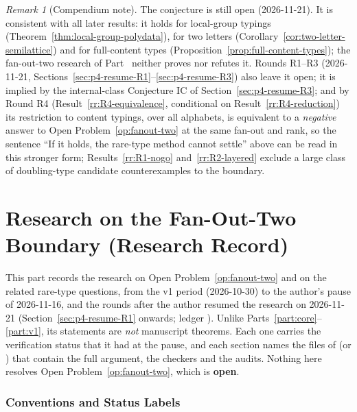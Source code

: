 \documentclass[11pt]{article}
\numberwithin{equation}{section}
\theoremstyle{plain}
\theoremstyle{definition}
\theoremstyle{remark}
\newtheorem{remark}[theorem]{Remark}
\theoremstyle{plain}
\begin{document}
\begin{remark}[Compendium note]
The conjecture is still open (2026-11-21).  It is consistent with all later results: it holds for local-group typings (Theorem~\ref{thm:local-group-polydata}), for two letters (Corollary~\ref{cor:two-letter-semilattice}) and for full-content types (Proposition~\ref{prop:full-content-types}); the fan-out-two research of Part~\ref{part:fanout-two-research} neither proves nor refutes it.  Rounds R1--R3 (2026-11-21, Sections~\ref{sec:p4-resume-R1}--\ref{sec:p4-resume-R3}) also leave it open; it is implied by the internal-class Conjecture IC of Section~\ref{sec:p4-resume-R3}; and by Round R4 (Result~\ref{rr:R4-equivalence}, conditional on Result~\ref{rr:R4-reduction}) its restriction to content typings, over all alphabets, is equivalent to a \emph{negative} answer to Open Problem~\ref{op:fanout-two} at the same fan-out and rank, so the sentence ``If it holds, the rare-type method cannot settle'' above can be read in this stronger form; Results~\ref{rr:R1-nogo} and~\ref{rr:R2-layered} exclude a large class of doubling-type candidate counterexamples to the boundary.
\end{remark}


\part{Research on the Fan-Out-Two Boundary (Research Record)}
\label{part:fanout-two-research}

This part records the research on Open Problem~\ref{op:fanout-two} and on the
related rare-type questions, from the v1 period (2026-10-30) to the author's pause
of 2026-11-16, and the rounds after the author resumed the research on 2026-11-21
(Section~\ref{sec:p4-resume-R1} onwards; ledger ).  Unlike Parts~\ref{part:core}--\ref{part:v1}, its statements are
\emph{not} manuscript theorems.  Each one carries the verification status that it
had at the pause, and each section names the files of
 (or ) that contain the full argument,
the checkers and the audits.  Nothing here resolves
Open Problem~\ref{op:fanout-two}, which is \textbf{open}.

\section{Conventions and Status Labels}
\label{sec:p4-conventions}
\end{document}
